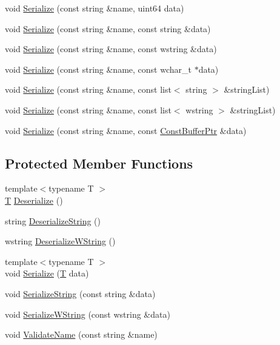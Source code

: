 \begin{DoxyCompactItemize}
\item 
void \hyperlink{class_gost_crypt_1_1_serializer_ad77f0928d2a7cc931107eb125d8d5d60}{Serialize} (const string \&name, uint64 data)
\item 
void \hyperlink{class_gost_crypt_1_1_serializer_a68963a3c66f169353021e153826f406f}{Serialize} (const string \&name, const string \&data)
\item 
void \hyperlink{class_gost_crypt_1_1_serializer_ae10e5a0f7ce2d5b3eec6b92ed6948286}{Serialize} (const string \&name, const wstring \&data)
\item 
void \hyperlink{class_gost_crypt_1_1_serializer_a6daf375451465aa21d4abca65f871284}{Serialize} (const string \&name, const wchar\+\_\+t $\ast$data)
\item 
void \hyperlink{class_gost_crypt_1_1_serializer_abbecfa71763f92f6813749e054a776fd}{Serialize} (const string \&name, const list$<$ string $>$ \&string\+List)
\item 
void \hyperlink{class_gost_crypt_1_1_serializer_ac758841863bdb2d47ede41ff9276db0c}{Serialize} (const string \&name, const list$<$ wstring $>$ \&string\+List)
\item 
void \hyperlink{class_gost_crypt_1_1_serializer_acae017dcb373e16aeb535eeb608d1c76}{Serialize} (const string \&name, const \hyperlink{class_gost_crypt_1_1_const_buffer_ptr}{Const\+Buffer\+Ptr} \&data)
\end{DoxyCompactItemize}
\subsection*{Protected Member Functions}
\begin{DoxyCompactItemize}
\item 
{\footnotesize template$<$typename T $>$ }\\\hyperlink{_stribog_8c_aba2f4c400d7a4c0bf0296be622087314}{T} \hyperlink{class_gost_crypt_1_1_serializer_aa9128b0f1fba82a15f03863cee1f8a40}{Deserialize} ()
\item 
string \hyperlink{class_gost_crypt_1_1_serializer_ae242985e8f3361a362ef2068768727e2}{Deserialize\+String} ()
\item 
wstring \hyperlink{class_gost_crypt_1_1_serializer_a1100ca9636e8d1cc3e7636a03f30d06b}{Deserialize\+W\+String} ()
\item 
{\footnotesize template$<$typename T $>$ }\\void \hyperlink{class_gost_crypt_1_1_serializer_a85b06038709a564d6cc741d3a0e9da32}{Serialize} (\hyperlink{_stribog_8c_aba2f4c400d7a4c0bf0296be622087314}{T} data)
\item 
void \hyperlink{class_gost_crypt_1_1_serializer_a0ff9e46389512da69d19ca7bb27b5993}{Serialize\+String} (const string \&data)
\item 
void \hyperlink{class_gost_crypt_1_1_serializer_aea0bc16b69e4df001a1477d9808bdc07}{Serialize\+W\+String} (const wstring \&data)
\item 
void \hyperlink{class_gost_crypt_1_1_serializer_ae0fef965dbfaeade8efd26bf7062a889}{Validate\+Name} (const string \&name)
\end{DoxyCompactItemize}
